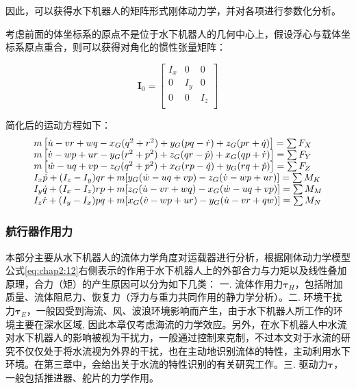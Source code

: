 因此，可以获得水下机器人的矩阵形式刚体动力学，并对各项进行参数化分析。

考虑前面的体坐标系的原点不是位于水下机器人的几何中心上，假设浮心与载体坐标系原点重合，则可以获得对角化的惯性张量矩阵：

\begin{equation}
\label{eq:chap2:15}
\bm{I}_0 = \begin{bmatrix}
 I_x  & 0    &  0   \\
 0    & I_y  &  0   \\
 0    & 0    &  I_z \\
\end{bmatrix}
\end{equation}

简化后的运动方程如下：
\begin{equation}
\centering
\label{eq:chap2:16}
\begin{array}{l}
 m\left[ {\dot u - vr + wq - {x_G}({q^2} + {r^2}) + {y_G}(pq - \dot r) + {z_G}(pr + \dot q)} \right] = \sum {{F_X}}  \\
 m\left[ {\dot v - wp + ur - {y_G}({r^2} + {p^2}) + {z_G}(qr - \dot p) + {x_G}(qp + \dot r)} \right] = \sum {{F_Y}}  \\
 m\left[ {\dot w - uq + vp - {z_G}({q^2} + {p^2}) + {x_G}(rp - \dot q) + {y_G}(rq + \dot p)} \right] = \sum {{F_Z}}  \\
 {I_x}\dot p + ({I_z} - {I_y})qr + m[{y_G}(\dot w - uq + vp) - {z_G}(\dot v - wp + ur)] = \sum {{M_K}}  \\
 {I_y}\dot q + ({I_x} - {I_z})rp + m[{z_G}(\dot u - vr + wq) - {x_G}(\dot w - uq + vp)] = \sum {{M_M}}  \\
 {I_z}\dot r + ({I_y} - {I_x})pq + m[{x_G}(\dot v - wp + ur) - {y_G}(\dot u - vr + qw)] = \sum {{M_N}}  \\
 \end{array}
 \end{equation}

\subsubsection{航行器作用力 }

本部分主要从水下机器人的流体力学角度对运载器进行分析，根据刚体动力学模型公式\ref{eq:chap2:12}右侧表示的作用于水下机器人上的外部合力与力矩以及线性叠加原理，合力（矩）的产生原因可以分为如下几类：
一. 流体作用力$\bm{\tau}_{H}$，包括附加质量、流体阻尼力、恢复力（浮力与重力共同作用的静力学分析）。二. 环境干扰力$\bm{\tau}_E$，一般因受到海流、风、波浪环境影响而产生，由于水下机器人所工作的环境主要在深水区域, 因此本章仅考虑海流的力学效应。另外，在水下机器人中水流对水下机器人的影响被视为干扰力，一般通过控制来克制，不过本文对于水流的研究不仅仅处于将水流视为外界的干扰，也在主动地识别流体的特性，主动利用水下环境。在第三章中，会给出关于水流的特性识别的有关研究工作。三. 驱动力$\bm{\tau}$，一般包括推进器、舵片的力学作用。

